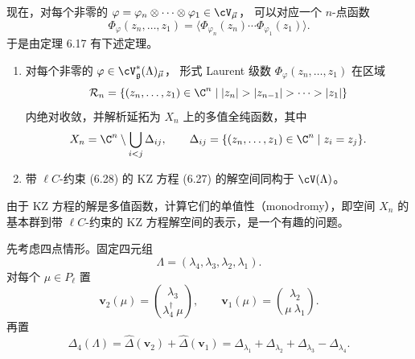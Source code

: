 


现在，对每个非零的
$\varphi=\varphi_n\otimes\cdots\otimes\varphi_1\in\cV_{\vec{\mu}}$，
可以对应一个 $n$-点函数
\[
\Phi_\varphi(z_n,\dots,z_1)
=\langle\Phi_{\varphi_n}(z_n)\cdots\Phi_{\varphi_1}(z_1)\rangle .
\]
于是由定理 6.17 有下述定理。

\begin{theorem}[6.18]
\begin{enumerate}[label=\arabic*.]
\item 对每个非零的 $\varphi\in\cV^{*}_{\mathfrak{g}}(\Lambda)_{\vec{\mu}}$，
形式 Laurent 级数 $\Phi_\varphi(z_n,\dots,z_1)$ 在区域
\[
\mathcal{R}_n=\{(z_n,\dots,z_1)\in\C^n\mid
|z_n|>|z_{n-1}|>\cdots>|z_1|\}
\]
内绝对收敛，并解析延拓为 $X_n$ 上的多值全纯函数，其中
\[
X_n=\C^n\setminus\bigcup_{i<j}\Delta_{ij},\qquad
\Delta_{ij}=\{(z_n,\dots,z_1)\in\C^n\mid z_i=z_j\}.
\]
\item 带 $\ell C$-约束 (6.28) 的 KZ 方程 (6.27) 的解空间同构于
$\cV(\Lambda)$。
\end{enumerate}
\end{theorem}


由于 KZ 方程的解是多值函数，计算它们的单值性（monodromy），即空间 $X_n$
的基本群到带 $\ell C$-约束的 KZ 方程解空间的表示，是一个有趣的问题。

先考虑四点情形。固定四元组
\[
\Lambda=(\lambda_4,\lambda_3,\lambda_2,\lambda_1).
\]
对每个 $\mu\in P_\ell$ 置
\[
\mathbf{v}_2(\mu)=\binom{\lambda_3}{\lambda_4^{\dagger}\ \mu},\qquad
\mathbf{v}_1(\mu)=\binom{\lambda_2}{\mu\ \lambda_1}.
\]
再置
\[
\Delta_4(\Lambda)=\widehat{\Delta}(\mathbf{v}_2)+\widehat{\Delta}(\mathbf{v}_1)
=\Delta_{\lambda_1}+\Delta_{\lambda_2}+\Delta_{\lambda_3}-\Delta_{\lambda_4}.
\]

